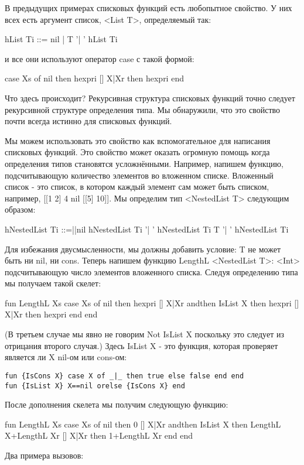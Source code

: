 В предыдущих примерах списковых функций есть любопытное свойство. У них всех есть аргумент список, <List T>, определяемый так:

hList Ti
::=
nil
|
T '| ' hList Ti

и все они используют оператор case с такой формой:

case Xs
of nil then hexpri %
[] X|Xr then hexpri %
end

Что здесь происходит? Рекурсивная структура списковых функций точно следует рекурсивной структуре определения типа. Мы обнаружили, что это свойство почти всегда истинно для списковых функций.

Мы можем использовать это свойство как вспомогательное для написания списковых функций. Это свойство может оказать огромную помощь когда определения типов становятся усложнёнными. Например, напишем функцию, подсчитывающую количество элементов во вложенном списке. Вложенный список - это список, в котором каждый элемент сам может быть списком, например, [[1 2] 4 nil [[5] 10]]. Мы определим тип <NestedList T> следующим образом:

hNestedList Ti
::=||nil
hNestedList Ti '| ' hNestedList Ti
T '| ' hNestedList Ti

Для избежания двусмысленности, мы должны добавить условие: T не может быть ни nil, ни cons. Теперь напишем функцию {LengthL <NestedList T>}: <Int> подсчитывающую число элементов вложенного списка. Следуя определению типа мы получаем такой скелет:

fun {LengthL Xs}
case Xs
of nil then hexpri
[] X|Xr andthen {IsList X} then
hexpri %
[] X|Xr then
hexpri %
end
end

(В третьем случае мы явно не говорим {Not {IsList X}} поскольку это следует из отрицания второго случая.) Здесь {IsList X} - это функция, которая проверяет является ли X nil-ом или cons-ом:

\begin{lstlisting}
fun {IsCons X} case X of _|_ then true else false end end
fun {IsList X} X==nil orelse {IsCons X} end
\end{lstlisting}

После дополнения скелета мы получим следующую функцию:

fun {LengthL Xs}
case Xs
of nil then 0
[] X|Xr andthen {IsList X} then
{LengthL X}+{LengthL Xr}
[] X|Xr then
1+{LengthL Xr}
end
end

Два примера вызовов:

